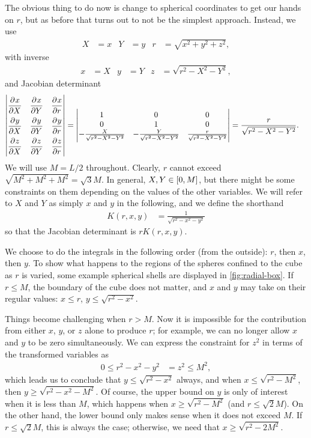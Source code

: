 The obvious thing to do now is change to spherical coordinates to get our hands on $r$, but as before that turns out to not be the simplest approach.
Instead, we use
\begin{align}
	X
	&= x
	&
	Y
	&= y
	&
	r
	&= \sqrt{x^2 + y^2 + z^2},
\end{align}
with inverse
\begin{align}
	x
	&= X
	&
	y
	&= Y
	&
	z
	&= \sqrt{r^2 - X^2 - Y^2},
\end{align}
and Jacobian determinant
\begin{align}
	\begin{vmatrix}
			\dpd{x}{X} & \dpd{x}{Y} & \dpd{x}{r} \\[3 mm]
			\dpd{y}{X} & \dpd{y}{Y} & \dpd{y}{r} \\[3 mm]
			\dpd{z}{X} & \dpd{z}{Y} & \dpd{z}{r}
		\end{vmatrix}
	&= \begin{vmatrix}
			1 & 0 & 0 \\
			0 & 1 & 0 \\
			-\frac{X}{\sqrt{r^2 - X^2 - Y^2}} & -\frac{Y}{\sqrt{r^2 - X^2 - Y^2}} & \frac{r}{\sqrt{r^2 - X^2 - Y^2}}
		\end{vmatrix}
	= \frac{r}{\sqrt{r^2 - X^2 - Y^2}}.
\end{align}
We will use $M = L / 2$ throughout.
Clearly, $r$ cannot exceed $\sqrt{M^2 + M^2 + M^2} = \sqrt{3} M$.
In general, $X, Y \in \intcc{0, M}$, but there might be some constraints on them depending on the values of the other variables.
We will refer to $X$ and $Y$ as simply $x$ and $y$ in the following, and we define the shorthand
\begin{align}
	K(r, x, y)
	&= \frac{1}{\sqrt{r^2 - x^2 - y^2}}
\end{align}
so that the Jacobian determinant is $r K(r, x, y)$.

We choose to do the integrals in the following order (from the outside): $r$, then $x$, then $y$.
To show what happens to the regions of the spheres confined to the cube as $r$ is varied, some example spherical shells are displayed in \cref{fig:radial-box}.
If $r \le M$, the boundary of the cube does not matter, and $x$ and $y$ may take on their regular values: $x \le r$, $y \le \sqrt{r^2 - x^2}$.

Things become challenging when $r > M$.
Now it is impossible for the contribution from either $x$, $y$, or $z$ alone to produce $r$; for example, we can no longer allow $x$ and $y$ to be zero simultaneously.
We can express the constraint for $z^2$ in terms of the transformed variables as
\begin{align}
	0
	\le r^2 - x^2 - y^2
	&= z^2
	\le M^2,
\end{align}
which leads us to conclude that $y \le \sqrt{r^2 - x^2}$ always, and when $x \le \sqrt{r^2 - M^2}$, then $y \ge \sqrt{r^2 - x^2 - M^2}$.
Of course, the upper bound on $y$ is only of interest when it is less than $M$, which happens when $x \ge \sqrt{r^2 - M^2}$ (and $r \le \sqrt{2} M$).
On the other hand, the lower bound only makes sense when it does not exceed $M$.
If $r \le \sqrt{2} M$, this is always the case; otherwise, we need that $x \ge \sqrt{r^2 - 2 M^2}$.

